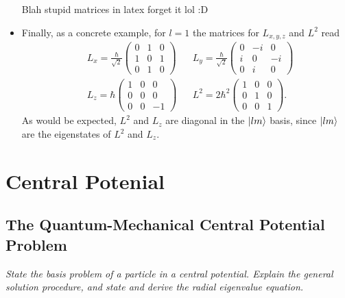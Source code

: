 \documentclass[11pt, a4paper]{article}
\begin{document}
\begin{itemize}
	Blah stupid matrices in latex forget it lol :D
	
	\fi
	
	\item Finally, as a concrete example, for $ l = 1 $ the matrices for $ L_{x, y, z} $ and $ L^{2} $ read
	\begin{align*}
		& L_{x} = \frac{\hbar}{\sqrt{2}} 
		\begin{pmatrix}
			0 & 1 & 0\\
			1 & 0 & 1\\
			0 & 1 & 0
		\end{pmatrix}
		&&
		L_{y} = \frac{\hbar}{\sqrt{2}} 
		\begin{pmatrix}
			0 & -i & 0 \\
			i & 0 & -i \\
			0 & i & 0
		\end{pmatrix}\\
		& L_{z} = \hbar
		\begin{pmatrix}
			1 & 0 & 0\\
			0 & 0 & 0\\
			0 & 0 & -1
		\end{pmatrix}
		&&
		L^{2} = 2\hbar^{2}
		\begin{pmatrix}
			1 & 0 & 0\\
			0 & 1 & 0\\
			0 & 0 & 1
		\end{pmatrix}.
	\end{align*}
	As would be expected, $ L^{2} $ and $ L_{z} $ are diagonal in the $ \ket{lm} $ basis, since $ \ket{lm} $ are the eigenstates of $ L^{2} $ and $ L_{z} $.
	
\end{itemize}



\newpage
\section{Central Potenial}

\subsection{The Quantum-Mechanical Central Potential Problem}
\textit{State the basis problem of a particle in a central potential. Explain the general solution procedure, and state and derive the radial eigenvalue equation.}
\end{document}
